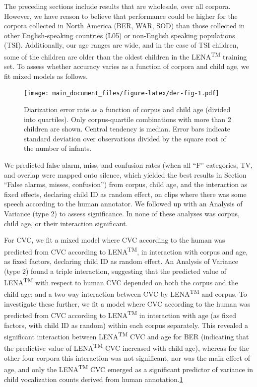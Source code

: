 \documentclass[english,floatsintext,man]{apa6}
\begin{document}
The preceding sections include results that are wholesale, over all
corpora. However, we have reason to believe that performance could be
higher for the corpora collected in North America (BER, WAR, SOD) than
those collected in other English-speaking countries (L05) or non-English
speaking populations (TSI). Additionally, our age ranges are wide, and
in the case of TSI children, some of the children are older than the
oldest children in the LENA\textsuperscript{TM} training set. To assess
whether accuracy varies as a function of corpora and child age, we fit
mixed models as follows.

\begin{figure}
\centering
\texttt{[image: main\_document\_files/figure-latex/der-fig-1.pdf]}
\caption{\label{fig:der-fig}Diarization error rate as a function of corpus
and child age (divided into quartiles). Only corpus-quartile
combinations with more than 2 children are shown. Central tendency is
median. Error bars indicate standard deviation over observations divided
by the square root of the number of infants.}
\end{figure}

We predicted false alarm, miss, and confusion rates (when all
\enquote{F} categories, TV, and overlap were mapped onto silence, which
yielded the best results in Section \enquote{False alarms, misses,
confusion}) from corpus, child age, and the interaction as fixed
effects, declaring child ID as random effect, on clips where there was
some speech according to the human annotator. We followed up with an
Analysis of Variance (type 2) to assess significance. In none of these
analyses was corpus, child age, or their interaction significant.

For CVC, we fit a mixed model where CVC according to the human was
predicted from CVC according to LENA\textsuperscript{TM}, in interaction
with corpus and age, as fixed factors, declaring child ID as random
effect. An Analysis of Variance (type 2) found a triple interaction,
suggesting that the predicted value of LENA\textsuperscript{TM} with
respect to human CVC depended on both the corpus and the child age; and
a two-way interaction between CVC by LENA\textsuperscript{TM} and
corpus. To investigate these further, we fit a model where CVC according
to the human was predicted from CVC according to
LENA\textsuperscript{TM} in interaction with age (as fixed factors, with
child ID as random) within each corpus separately. This revealed a
significant interaction between LENA\textsuperscript{TM} CVC and age for
BER (indicating that the predictive value of LENA\textsuperscript{TM}
CVC increased with child age), whereas for the other four corpora this
interaction was not significant, nor was the main effect of age, and
only the LENA\textsuperscript{TM} CVC emerged as a significant predictor
of variance in child vocalization counts derived from human
annotation.\href{For\%20both\%20BER\%20and\%20WAR,\%20the\%20variance\%20associated\%20to\%20the\%20child\%20ID\%20random\%20factor\%20was\%20zero.\%20This\%20suggests\%20a\%20mixed\%20model\%20was\%20not\%20necessary,\%20as\%20child\%20ID\%20is\%20not\%20explaining\%20any\%20additional\%20variance,\%20but\%20it\%20does\%20not\%20alter\%20the\%20interpretation\%20in\%20the\%20main\%20text.}{1}
\end{document}
